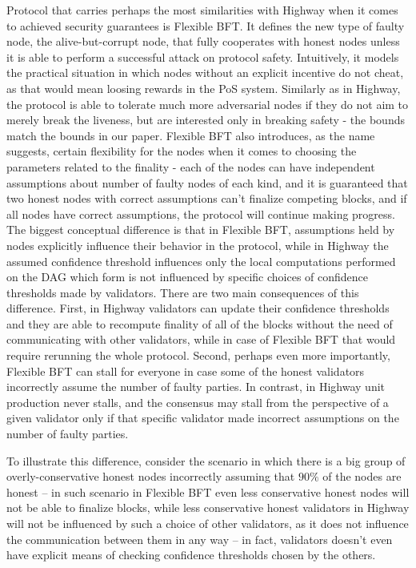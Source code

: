 \documentclass[12pt, fleqn]{article}
\begin{document}
Protocol that carries perhaps the most similarities with Highway when it comes to achieved security guarantees is Flexible BFT\cite{MNR19}.
It defines the new type of faulty node, the alive-but-corrupt node, that fully cooperates with honest nodes unless it is able to perform a successful attack on protocol safety.
Intuitively, it models the practical situation in which nodes without an explicit incentive do not cheat, as that would mean loosing rewards in the PoS system. 
Similarly as in Highway, the protocol is able to tolerate much more adversarial nodes if they do not aim to merely break the liveness, but are interested only in breaking safety - the bounds match the bounds in our paper. 
Flexible BFT also introduces, as the name suggests, certain flexibility for the nodes when it comes to choosing the parameters related to the finality - each of the nodes can have independent assumptions about number of faulty nodes of each kind, and it is guaranteed that two honest nodes with correct assumptions can't finalize competing blocks, and if all nodes have correct assumptions, the protocol will continue making progress.
The biggest conceptual difference is that in Flexible BFT, assumptions held by nodes explicitly influence their behavior in the protocol, while in Highway the assumed confidence threshold influences only the local computations performed on the DAG which form is not influenced by specific choices of confidence thresholds made by validators. 
There are two main consequences of this difference. First, in Highway validators can update their confidence thresholds and they are able to recompute finality of all of the blocks without the need of communicating with other validators, while in case of Flexible BFT that would require rerunning the whole protocol. 
Second, perhaps even more importantly, Flexible BFT can stall for everyone in case some of the honest validators incorrectly assume the number of faulty parties.
In contrast, in Highway unit production never stalls, and the consensus may stall from the perspective of a given validator only if that specific validator made incorrect assumptions on the number of faulty parties.

To illustrate this difference, consider the scenario in which there is a big group of overly-conservative honest nodes incorrectly assuming that $90\%$ of the nodes are honest -- in such scenario in Flexible BFT even less conservative honest nodes will not be able to finalize blocks, while less conservative honest validators in Highway will not be influenced by such a choice of other validators, as it does not influence the communication between them in any way -- in fact, validators doesn't even have explicit means of checking confidence thresholds chosen by the others. 
\end{document}
